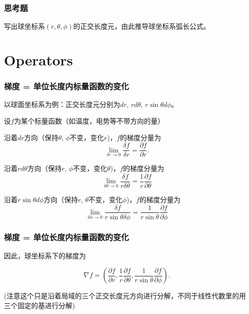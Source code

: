 \documentclass[CJK]{beamer}
\begin{document}
\begin{frame}
\frametitle{思考题}



写出球坐标系$(r,\theta, \phi)$的正交长度元，由此推导球坐标系弧长公式。


\end{frame}

\section{Operators}


\begin{frame}
  \frametitle{梯度 = 单位长度内标量函数的变化}
  
  以球面坐标系为例：正交长度元分别为$dr$, $rd\theta$, $r\sin\theta d\phi$。

  \skipline

  设$f$为某个标量函数（如温度，电势等不带方向的量）

  \bitem

\item{沿着$dr$方向（保持$\theta$, $\phi$不变，变化$r$)，$f$的梯度分量为
    $$\lim_{\delta r\rightarrow 0}\frac{\delta f}{\delta r} = \frac{\partial f}{\partial r}.$$}

\item{沿着$rd\theta$方向（保持$r$, $\phi$不变，变化$\theta$)，$f$的梯度分量为
  $$\lim_{\delta \theta \rightarrow 0}\frac{\delta f}{r\delta \theta} = \frac{1}{r}\frac{\partial f}{\partial \theta}$$}

\item{沿着$r\sin\theta d\phi$方向（保持$r$, $\theta$不变，变化$\phi$)，$f$的梯度分量为
  $$\lim_{\delta \phi \rightarrow 0}\frac{\delta f}{r\sin\theta \delta \phi} = \frac{1}{r\sin\theta}\frac{\partial f}{\partial \phi}$$}
  
    \eitem

  
\end{frame}



\begin{frame}
  \frametitle{梯度 = 单位长度内标量函数的变化}
  

  因此，球坐标系下的梯度为

  $$\nabla f = \left(\frac{\partial f}{\partial r}, \frac{1}{r}\frac{\partial f}{\partial \theta}, \frac{1}{r\sin\theta}\frac{\partial f}{\partial \phi} \right).$$

  \skiplines
  
  (注意这个只是沿着局域的三个正交长度元方向进行分解，不同于线性代数里的用三个固定的基进行分解)
  
\end{frame}
\end{document}
